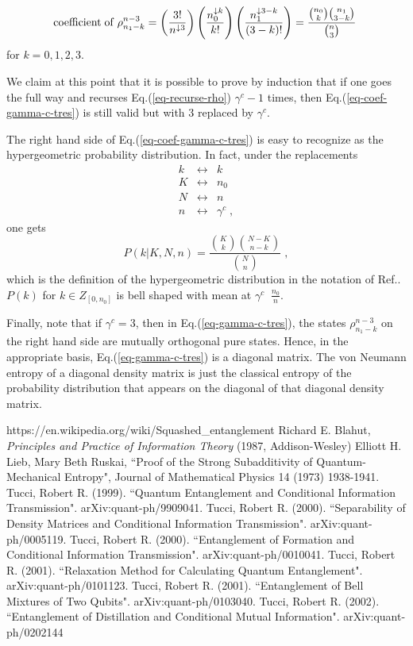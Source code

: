 \documentclass[12pt]{article}%
\newcommand{\beq}{\begin{equation}}
\newcommand{\eeq}{\end{equation}}
\newcommand{\beqa}{\begin{eqnarray}}
\newcommand{\eeqa}{\end{eqnarray}}
\newcommand{\darrow}[0]{{\downarrow}}
\begin{document}
{\beq
{\rm coefficient\;of\;}
\rho^{n-3}_{n_1-k} =
\left(\frac{3!}{n^{\darrow 3}}\right)
\left(\frac{n_0^{\darrow k}}{k!}\right)
\left(\frac{n_1^{\darrow 3-k}}{(3-k)!}\right)
=
\frac{{n_0\choose k}{n_1 \choose 3-k}}{{n\choose 3}}
\;
\label{eq-coef-gamma-c-tres}
\eeq
for $k=0,1,2,3$.

We claim at this point
that it is possible
to prove by induction
that if one goes the full way and recurses
Eq.(\ref{eq-recurse-rho}) $\gamma^c-1$
times, then
Eq.(\ref{eq-coef-gamma-c-tres})
is still valid but with
3 replaced by $\gamma^c$.

The right hand side of Eq.(\ref{eq-coef-gamma-c-tres})
is easy to recognize as the hypergeometric
probability distribution. In fact, under the
replacements
\beqa
k&\leftrightarrow&k
\\
K&\leftrightarrow&n_0
\\
N&\leftrightarrow&n
\\
n&\leftrightarrow&\gamma^c
\;,
\eeqa
one gets
\beq
P(k| K, N, n) =
\frac{{K\choose k}{N-K \choose n-k}}{{N\choose n}}
\;,
\eeq
which is the definition of the
hypergeometric distribution in
the notation of Ref.\cite{wiki-hypergeo}.
$P(k)$ for $k \in Z_{[0, n_0]}$
 is bell shaped with mean at $\gamma^c\;\;\frac{n_0}{n}$.

Finally, note that
if $\gamma^c=3$, then in Eq.(\ref{eq-gamma-c-tres}),
the states
$\rho^{n-3}_{n_1-k}$ on the right hand side are
mutually orthogonal pure states.
Hence, in the appropriate
basis,  Eq.(\ref{eq-gamma-c-tres})
is a diagonal matrix.
The von Neumann entropy of
a diagonal density matrix is
just
the classical entropy of
the probability distribution
that appears on the diagonal
of that diagonal density matrix.



\begin{thebibliography}{99}
https://en.wikipedia.org/wiki/Squashed\_entanglement
Richard E. Blahut, {\it Principles and Practice of Information Theory} (1987, Addison-Wesley)
 Elliott H. Lieb, Mary Beth Ruskai, ``Proof of the Strong Subadditivity of Quantum-Mechanical Entropy", Journal of Mathematical Physics 14 (1973) 1938-1941.
 Tucci, Robert R. (1999). ``Quantum Entanglement and Conditional Information Transmission". arXiv:quant-ph/9909041.
 Tucci, Robert R. (2000). ``Separability of Density Matrices and Conditional Information Transmission". arXiv:quant-ph/0005119.
 Tucci, Robert R. (2000). ``Entanglement of Formation and Conditional Information Transmission". arXiv:quant-ph/0010041.
 Tucci, Robert R. (2001). ``Relaxation Method for Calculating Quantum Entanglement". arXiv:quant-ph/0101123.
 Tucci, Robert R. (2001). ``Entanglement of Bell Mixtures of Two Qubits". arXiv:quant-ph/0103040.
 Tucci, Robert R. (2002). ``Entanglement of Distillation and Conditional Mutual Information". arXiv:quant-ph/0202144


\end{thebibliography}}
\end{document}
